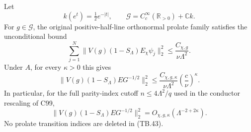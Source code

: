 \begin{theorem}
\label{AC-T29}
Let
\[
 k(e^t)=\tfrac12e^{-|t|},\qquad
 \mathscr G=C_c^\infty(\mathbb R_{>0})+\mathbb C k .
\]
For \(g\in\mathscr G\), the original positive-half-line
orthonormal prolate family satisfies the unconditional bound
\[
 \sum_{j=1}^N
       \|V(g)(1-S_\Lambda)E_\chi\psi_j\|_2^2
                       \leq\frac{C_{\chi,g}}{\nu\Lambda^2}.
 \tag{TB.41}
\]
Under \(A\), for every \(\kappa>0\) this gives
\[
 \|V(g)(1-S_\Lambda)EG^{-1/2}\|_2^2
       \leq\frac{C_{\chi,g,\kappa}}{\nu\Lambda^2}
                                  \left(\frac c\nu\right)^\kappa.
 \tag{TB.42}
\]
In particular, for the full parity-index cutoff
\(n\leq4\Lambda^2/q\) used in the conductor rescaling of C99,
\[
 \|V(g)(1-S_\Lambda)EG^{-1/2}\|_2^2
                 =O_{\chi,g,\kappa}(\Lambda^{-2+2\kappa}).
 \tag{TB.43}
\]
No prolate transition indices are deleted in (TB.43).
\end{theorem}
